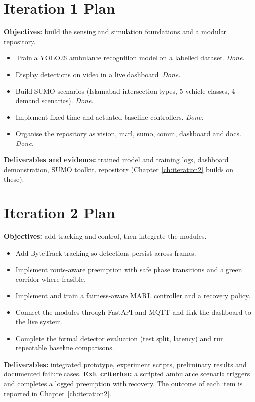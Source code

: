 \section{Iteration 1 Plan}
\textbf{Objectives:} build the sensing and simulation foundations and a modular repository.
\begin{itemize}
\item Train a YOLO26 ambulance recognition model on a labelled dataset. \emph{Done.}
\item Display detections on video in a live dashboard. \emph{Done.}
\item Build SUMO scenarios (Islamabad intersection types, 5 vehicle classes, 4 demand scenarios). \emph{Done.}
\item Implement fixed-time and actuated baseline controllers. \emph{Done.}
\item Organise the repository as vision, marl, sumo, comm, dashboard and docs. \emph{Done.}
\end{itemize}
\textbf{Deliverables and evidence:} trained model and training logs, dashboard demonstration, SUMO toolkit,
repository (Chapter~\ref{ch:iteration2} builds on these).

\section{Iteration 2 Plan}
\textbf{Objectives:} add tracking and control, then integrate the modules.
\begin{itemize}
\item Add ByteTrack tracking so detections persist across frames.
\item Implement route-aware preemption with safe phase transitions and a green corridor where feasible.
\item Implement and train a fairness-aware MARL controller and a recovery policy.
\item Connect the modules through FastAPI and MQTT and link the dashboard to the live system.
\item Complete the formal detector evaluation (test split, latency) and run repeatable baseline comparisons.
\end{itemize}
\textbf{Deliverables:} integrated prototype, experiment scripts, preliminary results and documented failure
cases. \textbf{Exit criterion:} a scripted ambulance scenario triggers and completes a logged preemption with
recovery. The outcome of each item is reported in Chapter~\ref{ch:iteration2}.

